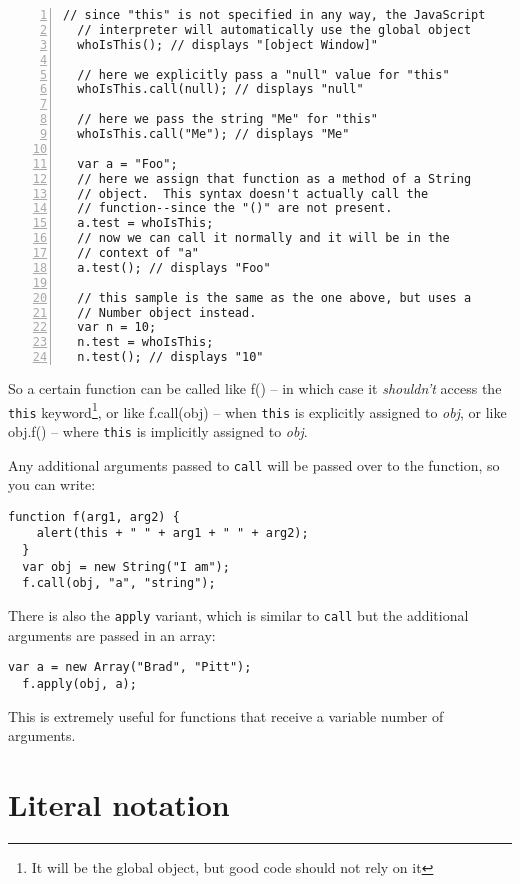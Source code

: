\begin{lstlisting}[nolol,name=FunctionObjectSample1,numbers=left]
  // since "this" is not specified in any way, the JavaScript
  // interpreter will automatically use the global object
  whoIsThis(); // displays "[object Window]"

  // here we explicitly pass a "null" value for "this"
  whoIsThis.call(null); // displays "null"

  // here we pass the string "Me" for "this"
  whoIsThis.call("Me"); // displays "Me"

  var a = "Foo";
  // here we assign that function as a method of a String
  // object.  This syntax doesn't actually call the
  // function--since the "()" are not present.
  a.test = whoIsThis;
  // now we can call it normally and it will be in the
  // context of "a"
  a.test(); // displays "Foo"

  // this sample is the same as the one above, but uses a
  // Number object instead.
  var n = 10;
  n.test = whoIsThis;
  n.test(); // displays "10"
\end{lstlisting}

So a certain function can be called like f() -- in which case it
\textit{shouldn't} access the \lstinline{this} keyword\footnote{It will be
  the global object, but good code should not rely on it}, or like
f.call(obj) -- when \lstinline{this} is explicitly assigned to \textit{obj},
or like obj.f() -- where \lstinline{this} is implicitly assigned to
\textit{obj}.

Any additional arguments passed to \lstinline{call} will be
passed over to the function, so you can write:

\begin{lstlisting}[nolol]
  function f(arg1, arg2) {
    alert(this + " " + arg1 + " " + arg2);
  }
  var obj = new String("I am");
  f.call(obj, "a", "string");
\end{lstlisting}

There is also the \lstinline{apply} variant, which is similar to
\lstinline{call} but the additional arguments are passed in an array:

\begin{lstlisting}[nolol]
  var a = new Array("Brad", "Pitt");
  f.apply(obj, a);
\end{lstlisting}

This is extremely useful for functions that receive a variable number of
arguments.

\section{Literal notation}

